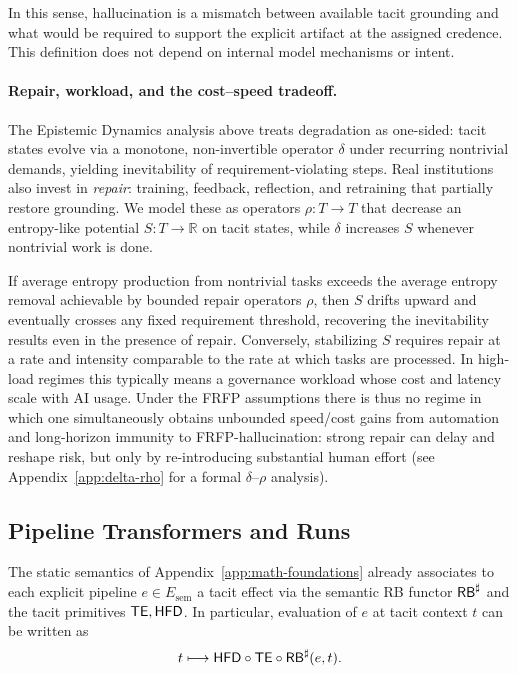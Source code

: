 In this sense, hallucination is a mismatch between available tacit
grounding and what would be required to support the explicit artifact at
the assigned credence. This definition does not depend on internal model
mechanisms or intent.

\paragraph{Repair, workload, and the cost--speed tradeoff.}
The Epistemic Dynamics analysis above treats degradation as one-sided: tacit states evolve via a monotone,
non-invertible operator $\delta$ under recurring nontrivial demands, yielding inevitability of
requirement-violating steps. Real institutions also invest in \emph{repair}: training, feedback,
reflection, and retraining that partially restore grounding. We model these as operators
$\rho : T \to T$ that decrease an entropy-like potential $S : T \to \mathbb{R}$ on tacit states, while
$\delta$ increases $S$ whenever nontrivial work is done.

If average entropy production from nontrivial tasks exceeds the average entropy removal achievable
by bounded repair operators $\rho$, then $S$ drifts upward and eventually crosses any fixed
requirement threshold, recovering the inevitability results even in the presence of repair.
Conversely, stabilizing $S$ requires repair at a rate and intensity comparable to the rate at which
tasks are processed. In high-load regimes this typically means a governance workload whose cost and
latency scale with AI usage. Under the FRFP assumptions there is thus no regime in which one
simultaneously obtains unbounded speed/cost gains from automation and long-horizon immunity to
FRFP-hallucination: strong repair can delay and reshape risk, but only by re-introducing substantial
human effort (see Appendix~\ref{app:delta-rho} for a formal $\delta$--$\rho$ analysis).

\subsection{Pipeline Transformers and Runs}
\label{subsec:epistemicdynamicsruns}

The static semantics of Appendix~\ref{app:math-foundations} already
associates to each explicit pipeline \(e\in E_{\mathrm{sem}}\) a tacit
effect via the semantic RB functor \(\mathsf{RB}^{\sharp}\) and the tacit primitives
\(\mathsf{TE},\mathsf{HFD}\). In particular, evaluation of \(e\) at tacit context \(t\)
can be written as
\[
t \longmapsto \mathsf{HFD}\circ \mathsf{TE} \circ \mathsf{RB}^{\sharp}(e,t).
\]

